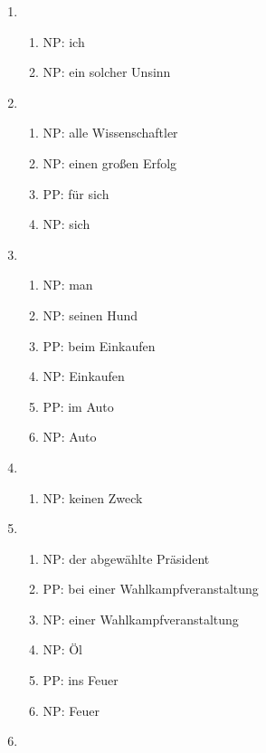 {\begin{enumerate}
\begin{enumerate}
        \item NP: keine regionalen Erdbeeren
        \item PP: in Deutschland
        \item NP: Deutschland
      \end{enumerate}
    \item 
      \begin{enumerate}
        \item NP: ich
        \item NP: ein solcher Unsinn
      \end{enumerate}
    \item 
      \begin{enumerate}
        \item NP: alle Wissenschaftler
        \item NP: einen großen Erfolg
        \item PP: für sich
        \item NP: sich
      \end{enumerate}
    \item 
      \begin{enumerate}
        \item NP: man
        \item NP: seinen Hund
        \item PP: beim Einkaufen
        \item NP: Einkaufen
        \item PP: im Auto
        \item NP: Auto
      \end{enumerate}
    \item 
      \begin{enumerate}
        \item NP: keinen Zweck
      \end{enumerate}
    \item 
      \begin{enumerate}
        \item NP: der abgewählte Präsident
        \item PP: bei einer Wahlkampfveranstaltung
        \item NP: einer Wahlkampfveranstaltung
        \item NP: Öl
        \item PP: ins Feuer
        \item NP: Feuer
      \end{enumerate}
    \item 
      \begin{enumerate}

\end{enumerate}
\end{enumerate}}
